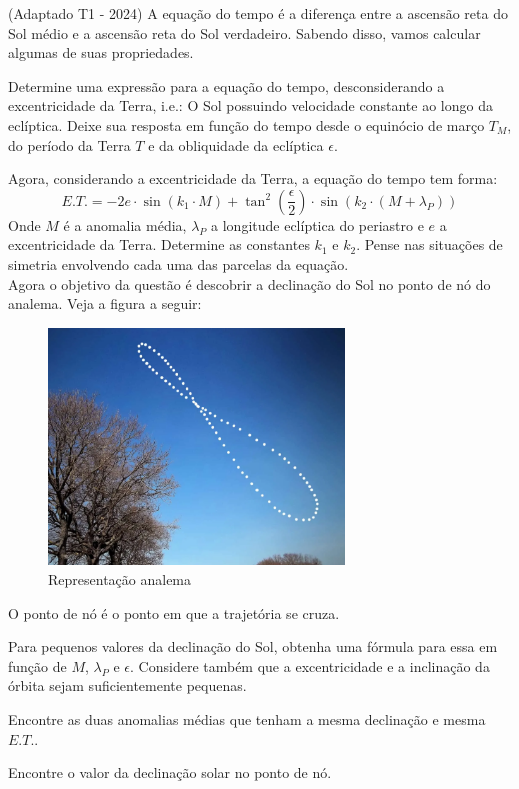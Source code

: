\documentclass[11pt]{article}
\begin{document}
\begin{pproblem} (Adaptado T1 - 2024)
    A equação do tempo é a diferença entre a ascensão reta do Sol médio e a ascensão reta do Sol verdadeiro. Sabendo disso, vamos calcular algumas de suas propriedades.
    \begin{alternativas}
        \item Determine uma expressão para a equação do tempo, desconsiderando a excentricidade da Terra, i.e.: O Sol possuindo velocidade constante ao longo da eclíptica. Deixe sua resposta em função do tempo desde o equinócio de março \(T_M\), do período da Terra \(T\) e da obliquidade da eclíptica \(\epsilon\).
        \item Agora, considerando a excentricidade da Terra, a equação do tempo tem forma:
        \[E.T. = -2e \cdot \sin(k_1 \cdot M) + \tan^2 \left( \frac{\epsilon}{2} \right) \cdot \sin\left( k_2 \cdot (M + \lambda_P) \right)\]
        Onde \(M\) é a anomalia média, \(\lambda_P\) a longitude eclíptica do periastro e \(e\) a excentricidade da Terra. Determine as constantes \(k_1\) e \(k_2\). Pense nas situações de simetria envolvendo cada uma das parcelas da equação.
        \\
        Agora o objetivo da questão é descobrir a declinação do Sol no ponto de nó do analema. Veja a figura a seguir:
        \begin{figure}[H]
            \centering
            \includegraphics[width=0.7\textwidth]{imagens/q16.png}
            \caption{Representação analema}
        \end{figure}
        O ponto de nó é o ponto em que a trajetória se cruza.
        \item Para pequenos valores da declinação do Sol, obtenha uma fórmula para essa em função de \(M\), \(\lambda_P\) e \(\epsilon\). Considere também que a excentricidade e a inclinação da órbita sejam suficientemente pequenas.
        \item Encontre as duas anomalias médias que tenham a mesma declinação e mesma \(E.T.\).
        \item Encontre o valor da declinação solar no ponto de nó.
    \end{alternativas}


\end{pproblem}
\end{document}

